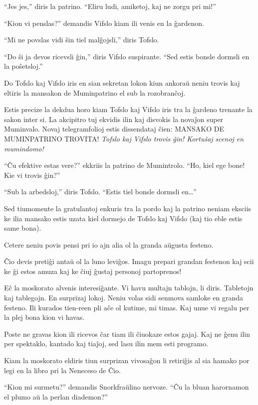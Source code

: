 ``Jes jes,'' diris la patrino. ``Eliru ludi, amiketoj, kaj ne zorgu pri mi!''

``Kion vi penslas?'' demandis Vifslo kiam ili venis en la ĝardenon.

``Mi ne povslas vidi ŝin tiel malĝojsli,'' diris Tofslo.

``Do ŝi ja devos ricevsli ĝin,'' diris Vifslo suspirante. ``Sed estis bonsle dormsli en la poŝetsloj.''

Do Tofslo kaj Vifslo iris en sian sekretan lokon kiun ankoraŭ neniu trovis kaj eltiris la mansakon de Muminpatrino el sub la rozobranĉoj.

Estis precize la dekdua horo kiam Tofslo kaj Vifslo iris tra la ĝardeno trenante la sakon inter si. La akcipitro tuj ekvidis ilin kaj disvokis la novaĵon super Muminvalo. Novaj telegramfolioj estis dissendataj ĉien: MANSAKO DE MUMINPATRINO TROVITA! \emph{Tofslo kaj Vifslo trovis ĝin! Kortuŝaj scenoj en mumindomo!}

``Ĉu efektive estas vere?'' ekkriis la patrino de Mumintrolo. ``Ho, kiel ege bone! Kie vi trovis ĝin?''

``Sub la arbedsloj,'' diris Tofslo. ``Estis tiel bonsle dormsli en{\ldots}''

Sed tiumomente la gratulantoj enkuris tra la pordo kaj la patrino neniam eksciis ke ilia mansako estis uzata kiel dormejo de Tofslo kaj Vifslo (kaj tio eble estis same bona).

Cetere neniu povis pensi pri io ajn alia ol la granda aŭgusta festeno.

Ĉio devis pretiĝi antaŭ ol la luno leviĝos. Imagu prepari grandan festenon kaj scii ke ĝi estos amuza kaj ke ĉiuj ĝustaj personoj partoprenos!

Eĉ la moskorato alvenis interesiĝante. Vi havu multajn tablojn, li diris. Tabletojn kaj tablegojn. En surprizaj lokoj. Neniu volas sidi senmova samloke en granda festeno. Ili kurados tien-reen pli aĉe ol kutime, mi timas. Kaj unue vi regalu per la plej bona kion vi havas.

Poste ne gravas kion ili ricevos ĉar tiam ili ĉiuokaze estos gajaj. Kaj ne ĝenu ilin per spektaklo, kantado kaj tiaĵoj, sed lasu ilin mem esti programo.

Kiam la moskorato eldiris tiun surprizan vivosaĝon li retiriĝis al sia hamako por legi en la libro pri la Neneceso de Ĉio.

``Kion mi surmetu?'' demandis Snorkfraŭlino nervoze. ``Ĉu la bluan harornamon el plumo aŭ la perlan diademon?''

